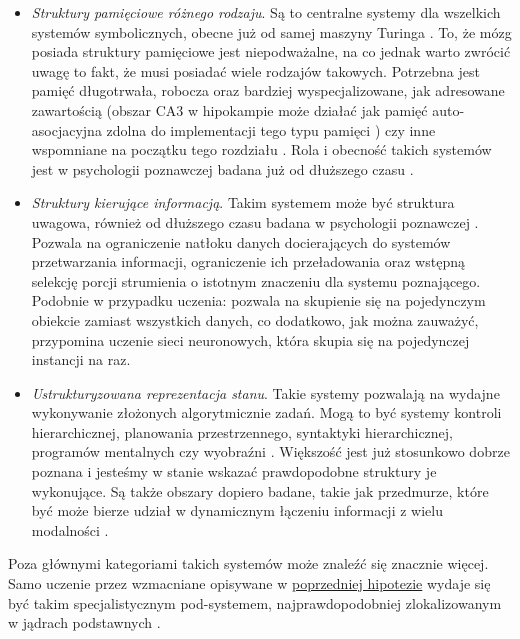 \begin{itemize}
	\item \emph{Struktury pamięciowe różnego rodzaju}.
	      Są to centralne systemy dla wszelkich systemów symbolicznych, obecne już od samej maszyny Turinga \cite{turing1937computable}.
	      To, że mózg posiada struktury pamięciowe jest niepodważalne, na co jednak warto zwrócić uwagę to fakt, że musi posiadać wiele rodzajów takowych.
	      Potrzebna jest pamięć długotrwała, robocza oraz bardziej wyspecjalizowane, jak adresowane zawartością (obszar CA3 w hipokampie może działać jak pamięć auto-asocjacyjna zdolna do implementacji tego typu pamięci \cite{rolls2013mechanisms}) czy inne wspomniane na początku tego rozdziału \cite{graves2014neural}.
	      Rola i obecność takich systemów jest w psychologii poznawczej badana już od dłuższego czasu \cite{baddeley2004psychology}.
	\item \emph{Struktury kierujące informacją}.
	      Takim systemem może być struktura uwagowa, również od dłuższego czasu badana w psychologii poznawczej \cite{pashler1999psychology}.
	      Pozwala na ograniczenie natłoku danych docierających do systemów przetwarzania informacji, ograniczenie ich przeładowania oraz wstępną selekcję porcji strumienia o istotnym znaczeniu dla systemu poznającego.
	      Podobnie w przypadku uczenia: pozwala na skupienie się na pojedynczym obiekcie zamiast wszystkich danych, co dodatkowo, jak można zauważyć, przypomina uczenie sieci neuronowych, która skupia się na pojedynczej instancji na raz.
	\item \emph{Ustrukturyzowana reprezentacja stanu}.
	      Takie systemy pozwalają na wydajne wykonywanie złożonych algorytmicznie zadań.
	      Mogą to być systemy kontroli hierarchicznej, planowania przestrzennego, syntaktyki hierarchicznej, programów mentalnych czy wyobraźni \cite{marblestone2016toward}.
	      Większość jest już stosunkowo dobrze poznana i jesteśmy w stanie wskazać prawdopodobne struktury je wykonujące.
	      Są także obszary dopiero badane, takie jak przedmurze, które być może bierze udział w dynamicznym łączeniu informacji z wielu modalności \cite{crick2005function}.
\end{itemize}

Poza głównymi kategoriami takich systemów może znaleźć się znacznie więcej.
Samo uczenie przez wzmacniane opisywane w \hyperref[subsec:cost-function-is-diverse]{poprzedniej hipotezie} wydaje się być takim specjalistycznym pod-systemem, najprawdopodobniej zlokalizowanym w jądrach podstawnych \cite{doya1999computations}.

